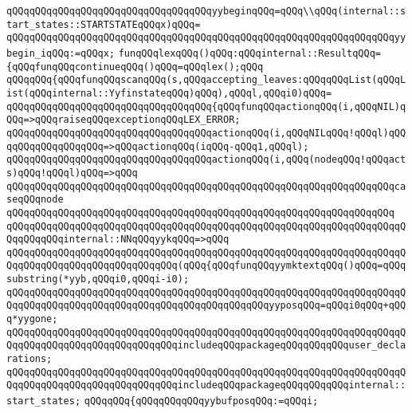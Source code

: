 \newline
\verb|qQQqqQQqqQQqqQQqqQQqqQQqqQQqqQQqqQQqyybeginqQQq=qQQq\\qQQq(internal::start_states::STARTSTATEqQQqx)qQQq=|\newline
\verb|qQQqqQQqqQQqqQQqqQQqqQQqqQQqqQQqqQQqqQQqqQQqqQQqqQQqqQQqqQQqqQQqqQQqyybegin_iqQQq:=qQQqx;|\newline
\newline
\verb|funqQQqlexqQQq()qQQq:qQQqinternal::ResultqQQq=|\newline
\verb|{qQQqfunqQQqcontinueqQQq()qQQq=qQQqlex();qQQq|\newline
\verb|qQQqqQQq{qQQqfunqQQqscanqQQq(s,qQQqaccepting_leaves:qQQqqQQqList(qQQqList(qQQqinternal::YyfinstateqQQq)qQQq),qQQql,qQQqi0)qQQq=|\newline
\verb|qQQqqQQqqQQqqQQqqQQqqQQqqQQqqQQqqQQq{qQQqfunqQQqactionqQQq(i,qQQqNIL)qQQq=>qQQqraiseqQQqexceptionqQQqLEX_ERROR;|\newline
\verb|qQQqqQQqqQQqqQQqqQQqqQQqqQQqqQQqqQQqactionqQQq(i,qQQqNILqQQq!qQQql)qQQqqQQqqQQqqQQqqQQq=>qQQqactionqQQq(iqQQq-qQQq1,qQQql);|\newline
\verb|qQQqqQQqqQQqqQQqqQQqqQQqqQQqqQQqqQQqactionqQQq(i,qQQq(nodeqQQq!qQQqacts)qQQq!qQQql)qQQq=>qQQq|\newline
\verb|qQQqqQQqqQQqqQQqqQQqqQQqqQQqqQQqqQQqqQQqqQQqqQQqqQQqqQQqqQQqqQQqqQQqcaseqQQqnode|\newline
\verb|qQQqqQQqqQQqqQQqqQQqqQQqqQQqqQQqqQQqqQQqqQQqqQQqqQQqqQQqqQQqqQQqqQQq|\newline
\verb|qQQqqQQqqQQqqQQqqQQqqQQqqQQqqQQqqQQqqQQqqQQqqQQqqQQqqQQqqQQqqQQqqQQqqQQqqQQqqQQqinternal::NNqQQqyykqQQq=>qQQq|\newline
\verb|qQQqqQQqqQQqqQQqqQQqqQQqqQQqqQQqqQQqqQQqqQQqqQQqqQQqqQQqqQQqqQQqqQQqqQQqqQQqqQQqqQQqqQQqqQQqqQQqqQQq(qQQq{qQQqfunqQQqyymktextqQQq()qQQq=qQQqsubstring(*yyb,qQQqi0,qQQqi-i0);|\newline
\verb|qQQqqQQqqQQqqQQqqQQqqQQqqQQqqQQqqQQqqQQqqQQqqQQqqQQqqQQqqQQqqQQqqQQqqQQqqQQqqQQqqQQqqQQqqQQqqQQqqQQqqQQqqQQqqQQqqQQqyyposqQQq=qQQqi0qQQq+qQQq*yygone;|\newline
\verb|qQQqqQQqqQQqqQQqqQQqqQQqqQQqqQQqqQQqqQQqqQQqqQQqqQQqqQQqqQQqqQQqqQQqqQQqqQQqqQQqqQQqqQQqqQQqqQQqqQQqincludeqQQqpackageqQQqqQQqqQQquser_declarations;|\newline
\verb|qQQqqQQqqQQqqQQqqQQqqQQqqQQqqQQqqQQqqQQqqQQqqQQqqQQqqQQqqQQqqQQqqQQqqQQqqQQqqQQqqQQqqQQqqQQqqQQqqQQqincludeqQQqpackageqQQqqQQqqQQqinternal::start_states;|\newline
\verb|qQQqqQQq{qQQqqQQqqQQqyybufposqQQq:=qQQqi;|\newline
